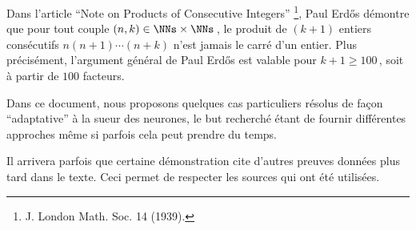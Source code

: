 Dans l'article \enquote{Note on Products of Consecutive Integers}
\footnote{
	J. London Math. Soc. 14 (1939).
},
Paul Erdős démontre que pour tout couple $(n, k) \in \NNs \times \NNs$\,, le produit de $(k+1)$ entiers consécutifs $n (n + 1) \cdots (n + k)$ n'est jamais le carré d'un entier. 
Plus précisément, l'argument général de Paul Erdős est valable pour $k + 1 \geq 100$\,, soit à partir de $100$ facteurs.

\medskip

Dans ce document, nous proposons quelques cas particuliers résolus de façon \enquote{adaptative} à la sueur des neurones, le but recherché étant de fournir différentes approches même si parfois cela peut prendre du temps.


\begin{remark}
	Il arrivera parfois que certaine démonstration cite d'autres preuves données plus tard dans le texte. Ceci permet de respecter les sources qui ont été utilisées.
\end{remark}
